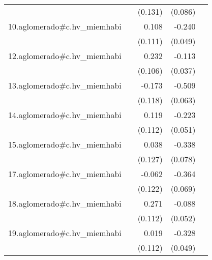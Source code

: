 {\begin{longtable}{l*{4}{D{.}{.}{-1}}}
            &                     &     (0.131)         &     (0.086)         &                     \\
\addlinespace
10.aglomerado#c.hv\_miemhabi&                     &       0.108         &      -0.240\sym{***}&                     \\
            &                     &     (0.111)         &     (0.049)         &                     \\
\addlinespace
12.aglomerado#c.hv\_miemhabi&                     &       0.232\sym{*}  &      -0.113\sym{**} &                     \\
            &                     &     (0.106)         &     (0.037)         &                     \\
\addlinespace
13.aglomerado#c.hv\_miemhabi&                     &      -0.173         &      -0.509\sym{***}&                     \\
            &                     &     (0.118)         &     (0.063)         &                     \\
\addlinespace
14.aglomerado#c.hv\_miemhabi&                     &       0.119         &      -0.223\sym{***}&                     \\
            &                     &     (0.112)         &     (0.051)         &                     \\
\addlinespace
15.aglomerado#c.hv\_miemhabi&                     &       0.038         &      -0.338\sym{***}&                     \\
            &                     &     (0.127)         &     (0.078)         &                     \\
\addlinespace
17.aglomerado#c.hv\_miemhabi&                     &      -0.062         &      -0.364\sym{***}&                     \\
            &                     &     (0.122)         &     (0.069)         &                     \\
\addlinespace
18.aglomerado#c.hv\_miemhabi&                     &       0.271\sym{*}  &      -0.088         &                     \\
            &                     &     (0.112)         &     (0.052)         &                     \\
\addlinespace
19.aglomerado#c.hv\_miemhabi&                     &       0.019         &      -0.328\sym{***}&                     \\
            &                     &     (0.112)         &     (0.049)         &                     \\

\end{longtable}}
